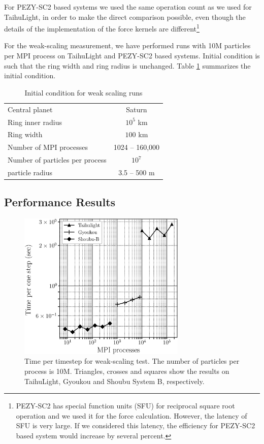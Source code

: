\documentclass[Afour,sageh,times]{sagej}
\newcommand{\rev}[1]{{#1}}
\begin{document}
For PEZY-SC2 based systems we used the same operation count as we used
for TaihuLight, in order to make the direct comparison possible, even
though the details of the implementation of the force kernels are
different\footnote{\rev{PEZY-SC2 has special function units (SFU) for
    reciprocal square root operation and we used it for the force
    calculation. However, the latency of SFU is very large. If we
    considered this latency, the efficiency for PEZY-SC2 based system
    would increase by several percent.}}

For the weak-scaling measurement, we have performed runs with 10M
particles per MPI process on TaihuLight and PEZY-SC2 based
systems. Initial condition is such that the ring width and ring radius
is unchanged. Table \ref{tab:initialcoditions} summarizes the initial
condition.


\begin{table}
\centering
 \caption{Initial condition for weak scaling runs}
 \label{tab:initialcoditions}
 \begin{tabular}{lc}
\hline
   Central planet & Saturn\\
   Ring inner radius & $10^5$ km\\
   Ring width        & $100$ km\\
   Number of MPI processes & 1024 -- 160,000 \\
   Number of particles per process & $10^7$  \\
   particle radius & 3.5 -- 500 m\\
\hline
\end{tabular}
\end{table}
  
\subsection{Performance Results}
\begin{figure}
  \includegraphics[width=8cm]{./fig/weak_scaling2.eps}
  \caption{Time per timestep for weak-scaling test. The number of
    particles per process is 10M. Triangles, crosses and squares show the
    results on TaihuLight, Gyoukou and Shoubu System B, respectively.
  }
  \label{fig:weak}
\end{figure}
\end{document}
